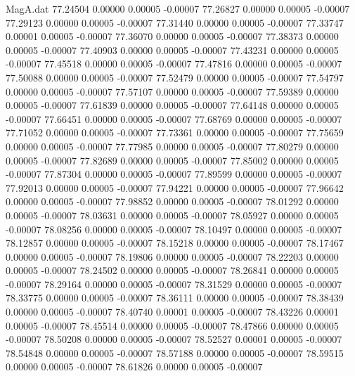 \begin{filecontents}{MagA.dat}
  77.24504    0.00000    0.00005   -0.00007
  77.26827    0.00000    0.00005   -0.00007
  77.29123    0.00000    0.00005   -0.00007
  77.31440    0.00000    0.00005   -0.00007
  77.33747    0.00001    0.00005   -0.00007
  77.36070    0.00000    0.00005   -0.00007
  77.38373    0.00000    0.00005   -0.00007
  77.40903    0.00000    0.00005   -0.00007
  77.43231    0.00000    0.00005   -0.00007
  77.45518    0.00000    0.00005   -0.00007
  77.47816    0.00000    0.00005   -0.00007
  77.50088    0.00000    0.00005   -0.00007
  77.52479    0.00000    0.00005   -0.00007
  77.54797    0.00000    0.00005   -0.00007
  77.57107    0.00000    0.00005   -0.00007
  77.59389    0.00000    0.00005   -0.00007
  77.61839    0.00000    0.00005   -0.00007
  77.64148    0.00000    0.00005   -0.00007
  77.66451    0.00000    0.00005   -0.00007
  77.68769    0.00000    0.00005   -0.00007
  77.71052    0.00000    0.00005   -0.00007
  77.73361    0.00000    0.00005   -0.00007
  77.75659    0.00000    0.00005   -0.00007
  77.77985    0.00000    0.00005   -0.00007
  77.80279    0.00000    0.00005   -0.00007
  77.82689    0.00000    0.00005   -0.00007
  77.85002    0.00000    0.00005   -0.00007
  77.87304    0.00000    0.00005   -0.00007
  77.89599    0.00000    0.00005   -0.00007
  77.92013    0.00000    0.00005   -0.00007
  77.94221    0.00000    0.00005   -0.00007
  77.96642    0.00000    0.00005   -0.00007
  77.98852    0.00000    0.00005   -0.00007
  78.01292    0.00000    0.00005   -0.00007
  78.03631    0.00000    0.00005   -0.00007
  78.05927    0.00000    0.00005   -0.00007
  78.08256    0.00000    0.00005   -0.00007
  78.10497    0.00000    0.00005   -0.00007
  78.12857    0.00000    0.00005   -0.00007
  78.15218    0.00000    0.00005   -0.00007
  78.17467    0.00000    0.00005   -0.00007
  78.19806    0.00000    0.00005   -0.00007
  78.22203    0.00000    0.00005   -0.00007
  78.24502    0.00000    0.00005   -0.00007
  78.26841    0.00000    0.00005   -0.00007
  78.29164    0.00000    0.00005   -0.00007
  78.31529    0.00000    0.00005   -0.00007
  78.33775    0.00000    0.00005   -0.00007
  78.36111    0.00000    0.00005   -0.00007
  78.38439    0.00000    0.00005   -0.00007
  78.40740    0.00001    0.00005   -0.00007
  78.43226    0.00001    0.00005   -0.00007
  78.45514    0.00000    0.00005   -0.00007
  78.47866    0.00000    0.00005   -0.00007
  78.50208    0.00000    0.00005   -0.00007
  78.52527    0.00001    0.00005   -0.00007
  78.54848    0.00000    0.00005   -0.00007
  78.57188    0.00000    0.00005   -0.00007
  78.59515    0.00000    0.00005   -0.00007
  78.61826    0.00000    0.00005   -0.00007

\end{filecontents}

